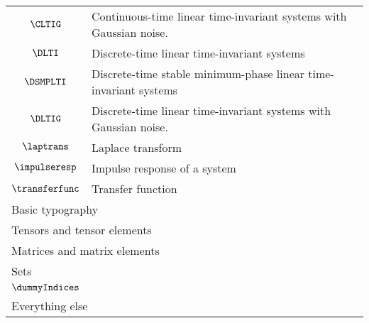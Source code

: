 \begin{longtable}{cl}
 $\CLTIG$ &  Continuous-time linear time-invariant systems with Gaussian noise.\\ 
 $\DLTI$ &  Discrete-time linear time-invariant systems\\ 
 $\DSMPLTI$ &  Discrete-time stable minimum-phase linear time-invariant systems\\ 
 $\DLTIG$ &  Discrete-time linear time-invariant systems with Gaussian noise.\\ 
 $\laptrans$ &  Laplace transform\\ 
 $\impulseresp$ &  Impulse response of a system\\ 
 $\transferfunc$ &  Transfer function\\ 
 \multicolumn{2}{l}{Basic typography}\\ 
 \hline
\hline
\multicolumn{2}{l}{Tensors and tensor elements}\\ 
 \hline
\multicolumn{2}{l}{Matrices and matrix elements}\\ 
 \hline
\multicolumn{2}{l}{Sets}\\ 
 \hline
$\dummyIndices$ & \\ 
 \multicolumn{2}{l}{Everything else}\\ 
 \hline
\end{longtable}
